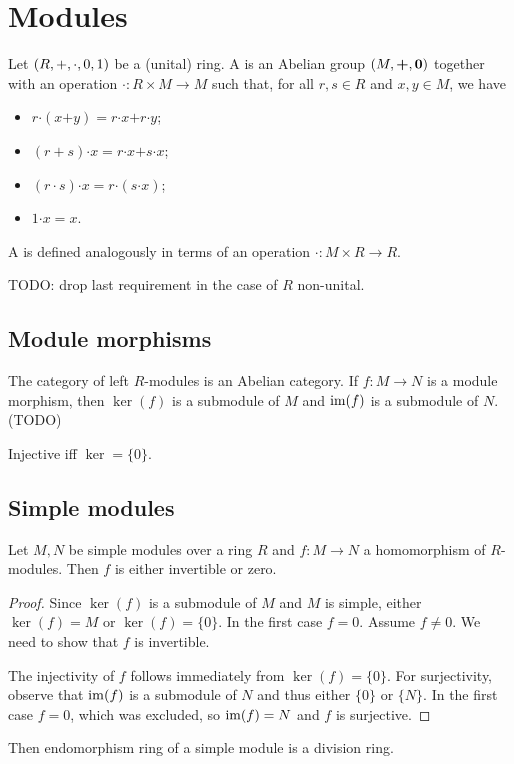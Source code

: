 \section{Modules}
\begin{definition}
Let $\sSet{R, +, \cdot, 0,1}$ be a (unital) ring. A  is an Abelian group $\sSet{M, \boldsymbol{+}, \vec{0}}$ together with an operation $\boldsymbol{\cdot}: R\times M \to M$ such that, for all $r,s\in R$ and $x,y \in M$, we have
\begin{itemize}
\item $r \boldsymbol{\cdot} (x\boldsymbol{+}y) = r\boldsymbol{\cdot}x \boldsymbol{+} r\boldsymbol{\cdot} y$;
\item $(r+s)\boldsymbol{\cdot} x = r\boldsymbol{\cdot}x \boldsymbol{+} s\boldsymbol{\cdot} x$;
\item $(r\cdot s)\boldsymbol{\cdot}x = r\boldsymbol{\cdot}(s\boldsymbol{\cdot}x)$;
\item $1\boldsymbol{\cdot}x = x$.
\end{itemize}
A  is defined analogously in terms of an operation $\boldsymbol{\cdot}: M\times R \to R$.
\end{definition}
TODO: drop last requirement in the case of $R$ non-unital.

\subsection{Module morphisms}
The category of left $R$-modules is an Abelian category. If $f: M\to N$ is a module morphism, then $\ker(f)$ is a submodule of $M$ and $\operatorname{im}(f)$ is a submodule of $N$. (TODO)

\begin{lemma}
Injective iff $\ker = \{0\}$. 
\end{lemma}

\subsection{Simple modules}

\begin{theorem} \label{SchursLemma}
Let $M,N$ be simple modules over a ring $R$ and $f:M\to N$ a homomorphism of $R$-modules. Then $f$ is either invertible or zero.
\end{theorem}
\begin{proof}
Since $\ker(f)$ is a submodule of $M$ and $M$ is simple, either $\ker(f) = M$ or $\ker(f) = \{0\}$. In the first case $f = 0$. Assume $f\neq 0$. We need to show that $f$ is invertible.

The injectivity of $f$ follows immediately from $\ker(f) = \{0\}$. For surjectivity, observe that $\operatorname{im}(f)$ is a submodule of $N$ and thus either $\{0\}$ or $\{N\}$. In the first case $f = 0$, which was excluded, so $\operatorname{im}(f) = N$ and $f$ is surjective.
\end{proof}
\begin{corollary}
Then endomorphism ring of a simple module is a division ring.
\end{corollary}

